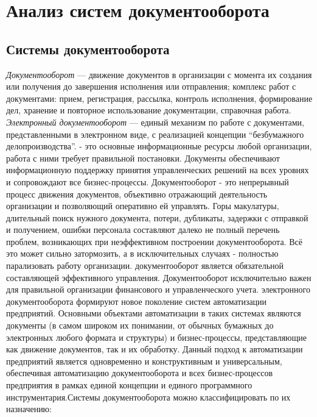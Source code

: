 \documentclass[14pt,a4paper]{reportmod}
\begin{document}
\chapter{Анализ систем документооборота}

\section{Системы документооборота}
\textit{Документооборот} — движение документов в организации с момента их создания или получения до завершения исполнения или отправления; комплекс работ с документами: прием, регистрация, рассылка, контроль исполнения, формирование дел, хранение и повторное использование документации, справочная работа.
\textit{Электронный документооборот}  — единый механизм по работе с документами, представленными в электронном виде, с реализацией концепции ``безбумажного делопроизводства''.\cite{refwikidoc}
 - это основные информационные ресурсы любой организации, работа с ними требует правильной постановки. Документы обеспечивают информационную поддержку принятия управленческих решений на всех уровнях и сопровождают все бизнес-процессы. Документооборот - это непрерывный процесс движения документов, объективно отражающий деятельность организации и позволяющий оперативно ей управлять. Горы макулатуры, длительный поиск нужного документа, потери, дубликаты, задержки с отправкой и получением, ошибки персонала составляют далеко не полный перечень проблем, возникающих при неэффективном построении документооборота. Всё это может сильно затормозить, а в исключительных случаях - полностью парализовать работу организации.\cite{refdoconline}
 документооборот является обязательной составляющей эффективного управления. Документооборот исключительно важен для правильной организации финансового и управленческого учета.
 электронного документооборота формируют новое поколение систем автоматизации предприятий. Основными объектами автоматизации в таких системах являются документы (в самом широком их понимании, от обычных бумажных до электронных любого формата и структуры) и бизнес-процессы, представляющие как движение документов, так и их обработку. Данный подход к автоматизации предприятий является одновременно и конструктивным и универсальным, обеспечивая автоматизацию документооборота и всех бизнес-процессов предприятия в рамках единой концепции и единого программного инструментария.Системы документооборота можно классифицировать по их назначению:
\end{document}
